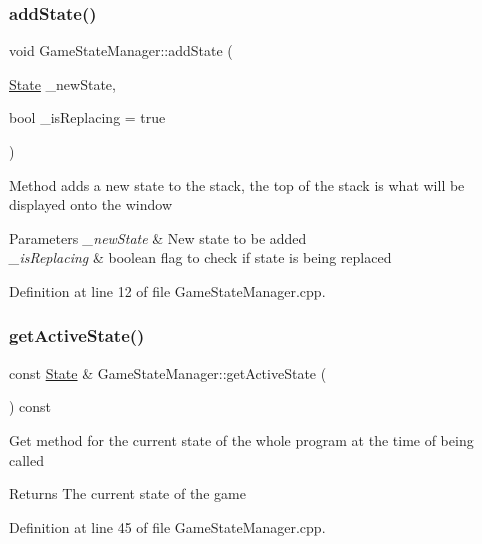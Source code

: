 \subsubsection{\texorpdfstring{addState()}{addState()}}
{\footnotesize\ttfamily void Game\+State\+Manager\+::add\+State (\begin{DoxyParamCaption}\item[{\mbox{\hyperlink{_game_state_manager_8h_aff87e674f0407654608d089427df6ab3}{State}}}]{\+\_\+new\+State,  }\item[{bool}]{\+\_\+is\+Replacing = {\ttfamily true} }\end{DoxyParamCaption})}

Method adds a new state to the stack, the top of the stack is what will be displayed onto the window 
\begin{DoxyParams}{Parameters}
{\em \+\_\+new\+State} & New state to be added \\
\hline
{\em \+\_\+is\+Replacing} & boolean flag to check if state is being replaced \\
\hline
\end{DoxyParams}


Definition at line 12 of file Game\+State\+Manager.\+cpp.

\mbox{\label{class_game_state_manager_a5b42b1e97123439df8e476c89d3b8a68}} 
\subsubsection{\texorpdfstring{getActiveState()}{getActiveState()}}
{\footnotesize\ttfamily const \mbox{\hyperlink{_game_state_manager_8h_aff87e674f0407654608d089427df6ab3}{State}} \& Game\+State\+Manager\+::get\+Active\+State (\begin{DoxyParamCaption}{ }\end{DoxyParamCaption}) const}

Get method for the current state of the whole program at the time of being called \begin{DoxyReturn}{Returns}
The current state of the game 
\end{DoxyReturn}


Definition at line 45 of file Game\+State\+Manager.\+cpp.

\mbox{\label{class_game_state_manager_aa392462be47af93a17c12d2b9f90afb0}} 
